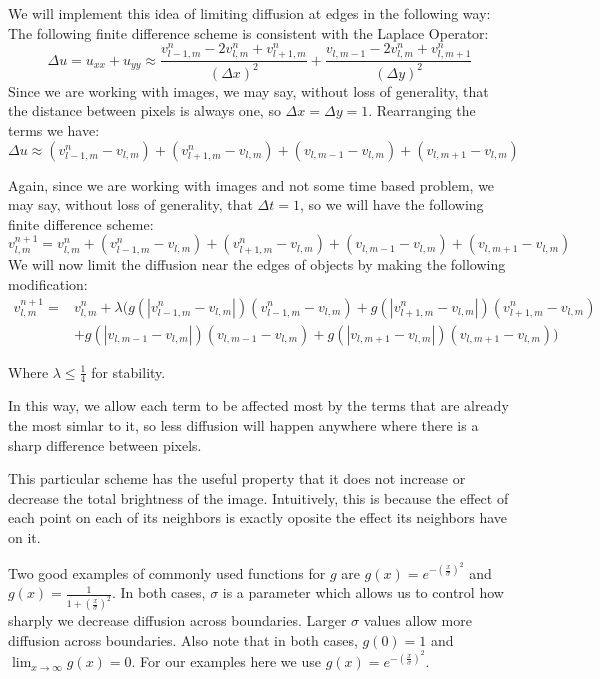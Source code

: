 We will implement this idea of limiting diffusion at edges in the following way:
The following finite difference scheme is consistent with the Laplace Operator:
\[\Delta u = u_{xx}+u_{yy} \approx \frac{v_{l-1,m}^n - 2 v_{l,m}^n + v_{l+1,m}^n}{(\Delta x)^2} + \frac{v_{l,m-1}-2 v_{l,m}^n + v_{l,m+1}^n}{(\Delta y)^2}\]
Since we are working with images, we may say, without loss of generality, that the distance between pixels is always one, so $\Delta x = \Delta y = 1$. Rearranging the terms we have:
\[\Delta u \approx (v_{l-1,m}^n - v_{l,m}) + (v_{l+1,m}^n - v_{l,m}) + (v_{l,m-1} - v_{l,m}) + (v_{l,m+1} - v_{l,m})\]

Again, since we are working with images and not some time based problem, we may say, without loss of generality, that $\Delta t = 1$, so we will have the following finite difference scheme:
\[v_{l,m}^{n+1} = v_{l,m}^n + (v_{l-1,m}^n - v_{l,m}) + (v_{l+1,m}^n - v_{l,m}) + (v_{l,m-1} - v_{l,m}) + (v_{l,m+1} - v_{l,m})\]
We will now limit the diffusion near the edges of objects by making the following modification:
\begin{equation*}
\begin{split}
v_{l,m}^{n+1} =& v_{l,m}^n + \lambda (g(|v_{l-1,m}^n - v_{l,m}|)(v_{l-1,m}^n - v_{l,m}) + g(|v_{l+1,m}^n - v_{l,m}|)(v_{l+1,m}^n - v_{l,m}) \\
 &+ g(|v_{l,m-1} - v_{l,m}|)(v_{l,m-1} - v_{l,m}) + g(|v_{l,m+1} - v_{l,m}|)(v_{l,m+1} - v_{l,m}))
\end{split}
\end{equation*}

Where $\lambda \leq \frac{1}{4}$ for stability.

In this way, we allow each term to be affected most by the terms that are already the most simlar to it, so less diffusion will happen anywhere where there is a sharp difference between pixels.

This particular scheme has the useful property that it does not increase or decrease the total brightness of the image.
Intuitively, this is because the effect of each point on each of its neighbors is exactly oposite the effect its neighbors have on it.

Two good examples of commonly used functions for $g$ are $g(x) = e^{-\left(\frac{x}{\sigma}\right)^2}$ and $g(x) = \frac{1}{1+\left(\frac{x}{\sigma}\right)^2}$. 
In both cases, $\sigma$ is a parameter which allows us to control how sharply we decrease diffusion across boundaries.
Larger $\sigma$ values allow more diffusion across boundaries.
Also note that in both cases, $g(0) = 1$ and $\displaystyle{\lim_{x\to \infty} g(x) = 0}$.
For our examples here we use $g(x)=e^{-\left(\frac{x}{\sigma}\right)^2}$.


